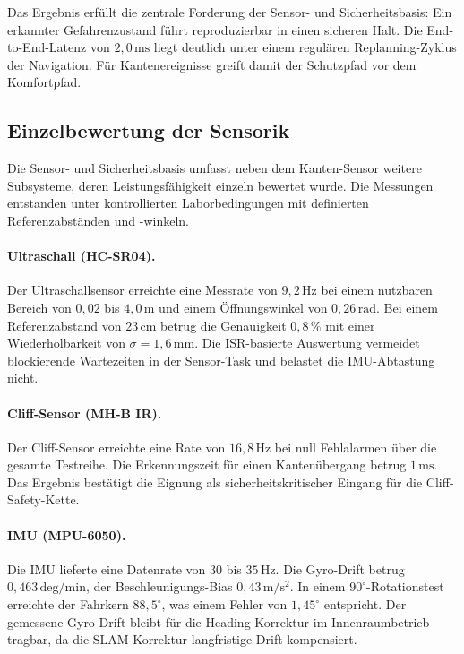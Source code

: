 Das Ergebnis erfüllt die zentrale Forderung der Sensor- und Sicherheitsbasis: Ein erkannter Gefahrenzustand führt reproduzierbar in einen sicheren Halt. Die End-to-End-Latenz von $2{,}0\,\mathrm{ms}$ liegt deutlich unter einem regulären Replanning-Zyklus der Navigation. Für Kantenereignisse greift damit der Schutzpfad vor dem Komfortpfad.

\subsection{Einzelbewertung der Sensorik}

Die Sensor- und Sicherheitsbasis umfasst neben dem Kanten-Sensor weitere Subsysteme, deren Leistungsfähigkeit einzeln bewertet wurde. Die Messungen entstanden unter kontrollierten Laborbedingungen mit definierten Referenzabständen und -winkeln.

\paragraph{Ultraschall (HC-SR04).}
Der Ultraschallsensor erreichte eine Messrate von $9{,}2\,\mathrm{Hz}$ bei einem nutzbaren Bereich von $0{,}02$ bis $4{,}0\,\mathrm{m}$ und einem Öffnungswinkel von $0{,}26\,\mathrm{rad}$. Bei einem Referenzabstand von $23\,\mathrm{cm}$ betrug die Genauigkeit $0{,}8\,\%$ mit einer Wiederholbarkeit von $\sigma = 1{,}6\,\mathrm{mm}$. Die ISR-basierte Auswertung vermeidet blockierende Wartezeiten in der Sensor-Task und belastet die IMU-Abtastung nicht.

\paragraph{Cliff-Sensor (MH-B IR).}
Der Cliff-Sensor erreichte eine Rate von $16{,}8\,\mathrm{Hz}$ bei null Fehlalarmen über die gesamte Testreihe. Die Erkennungszeit für einen Kantenübergang betrug $1\,\mathrm{ms}$. Das Ergebnis bestätigt die Eignung als sicherheitskritischer Eingang für die Cliff-Safety-Kette.

\paragraph{IMU (MPU-6050).}
Die IMU lieferte eine Datenrate von $30$ bis $35\,\mathrm{Hz}$. Die Gyro-Drift betrug $0{,}463\,\mathrm{deg/min}$, der Beschleunigungs-Bias $0{,}43\,\mathrm{m/s^2}$. In einem $90^\circ$-Rotationstest erreichte der Fahrkern $88{,}5^\circ$, was einem Fehler von $1{,}45^\circ$ entspricht. Der gemessene Gyro-Drift bleibt für die Heading-Korrektur im Innenraumbetrieb tragbar, da die SLAM-Korrektur langfristige Drift kompensiert.

